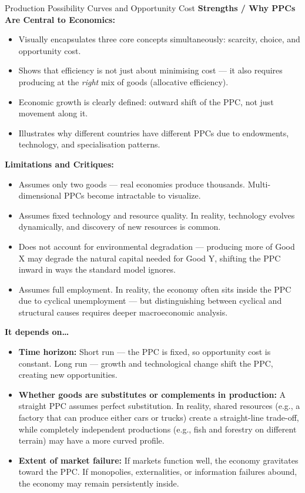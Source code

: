 \documentclass[11pt, a4paper, twoside]{book}
\begin{document}
\begin{evaluation}{Production Possibility Curves and Opportunity Cost}
\textbf{Strengths / Why PPCs Are Central to Economics:}
\begin{itemize}[leftmargin=*, nosep]
\item Visually encapsulates three core concepts simultaneously: scarcity, choice, and opportunity cost.
\item Shows that efficiency is not just about minimising cost — it also requires producing at the \emph{right} mix of goods (allocative efficiency).
\item Economic growth is clearly defined: outward shift of the PPC, not just movement along it.
\item Illustrates why different countries have different PPCs due to endowments, technology, and specialisation patterns.
\end{itemize}

\textbf{Limitations and Critiques:}
\begin{itemize}[leftmargin=*, nosep]
\item Assumes only two goods — real economies produce thousands. Multi-dimensional PPCs become intractable to visualize.
\item Assumes fixed technology and resource quality. In reality, technology evolves dynamically, and discovery of new resources is common.
\item Does not account for environmental degradation — producing more of Good X may degrade the natural capital needed for Good Y, shifting the PPC inward in ways the standard model ignores.
\item Assumes full employment. In reality, the economy often sits inside the PPC due to cyclical unemployment — but distinguishing between cyclical and structural causes requires deeper macroeconomic analysis.
\end{itemize}

\textbf{It depends on\ldots}
\begin{itemize}[leftmargin=*, nosep]
\item \textbf{Time horizon:} Short run — the PPC is fixed, so opportunity cost is constant. Long run — growth and technological change shift the PPC, creating new opportunities.
\item \textbf{Whether goods are substitutes or complements in production:} A straight PPC assumes perfect substitution. In reality, shared resources (e.g., a factory that can produce either cars or trucks) create a straight-line trade-off, while completely independent productions (e.g., fish and forestry on different terrain) may have a more curved profile.
\item \textbf{Extent of market failure:} If markets function well, the economy gravitates toward the PPC. If monopolies, externalities, or information failures abound, the economy may remain persistently inside.
\end{itemize}
\end{evaluation}
\end{document}
